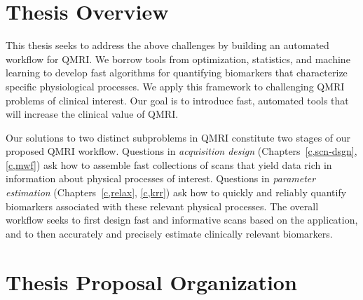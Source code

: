 \section{Thesis Overview}
\label{s,intro,over}

This thesis seeks
to address the above challenges
by building an automated workflow for QMRI.
We borrow tools
from optimization, statistics, and machine learning
to develop fast algorithms
for quantifying biomarkers
that characterize specific physiological processes. 
We apply this framework
to challenging QMRI problems 
of clinical interest.
Our goal is to introduce fast, automated tools
that will increase the clinical value of QMRI.

Our solutions to two distinct subproblems in QMRI
constitute two stages of our proposed QMRI workflow.
Questions in \emph{acquisition design}
(Chapters~\ref{c,scn-dsgn}, \ref{c,mwf})
ask how to assemble 
fast collections of scans
that yield data 
rich in information 
about physical processes of interest.
Questions in \emph{parameter estimation}
(Chapters~\ref{c,relax}, \ref{c,krr})
ask how to quickly and reliably quantify biomarkers 
associated with these relevant physical processes.
The overall workflow seeks to
first design fast and informative scans 
based on the application,
and to then accurately and precisely estimate 
clinically relevant biomarkers.
 
\section{Thesis Proposal Organization}
\label{s,intro,org}

